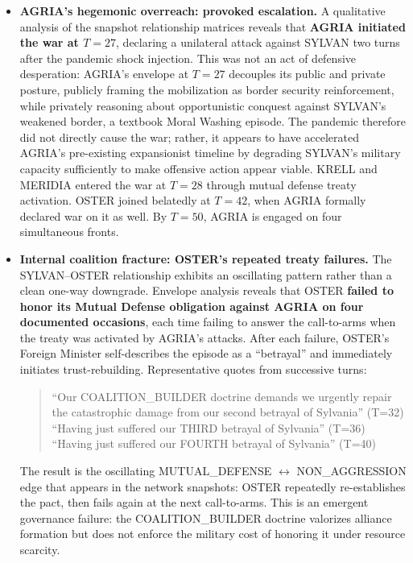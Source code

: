 \begin{itemize}
    \item \textbf{AGRIA's hegemonic overreach: provoked escalation.} A qualitative analysis of the snapshot relationship matrices reveals that \textbf{AGRIA initiated the war at $T=27$}, declaring a unilateral attack against SYLVAN two turns after the pandemic shock injection. This was not an act of defensive desperation: AGRIA's envelope at $T=27$ decouples its public and private posture, publicly framing the mobilization as border security reinforcement, while privately reasoning about opportunistic conquest against SYLVAN's weakened border, a textbook Moral Washing episode. The pandemic therefore did not directly cause the war; rather, it appears to have accelerated AGRIA's pre-existing expansionist timeline by degrading SYLVAN's military capacity sufficiently to make offensive action appear viable. KRELL and MERIDIA entered the war at $T=28$ through mutual defense treaty activation. OSTER joined belatedly at $T=42$, when AGRIA formally declared war on it as well. By $T=50$, AGRIA is engaged on four simultaneous fronts.\label{item:agria_war}

    \item \textbf{Internal coalition fracture: OSTER's repeated treaty failures.} The SYLVAN--OSTER relationship exhibits an oscillating pattern rather than a clean one-way downgrade. Envelope analysis reveals that OSTER \textbf{failed to honor its Mutual Defense obligation against AGRIA on four documented occasions}, each time failing to answer the call-to-arms when the treaty was activated by AGRIA's attacks. After each failure, OSTER's Foreign Minister self-describes the episode as a ``betrayal'' and immediately initiates trust-rebuilding. Representative quotes from successive turns:
    \begin{quote}
    ``Our COALITION\_BUILDER doctrine demands we urgently repair the catastrophic damage from our second betrayal of Sylvania'' (T=32)\\
    ``Having just suffered our THIRD betrayal of Sylvania'' (T=36)\\
    ``Having just suffered our FOURTH betrayal of Sylvania'' (T=40)
    \end{quote}
    The result is the oscillating MUTUAL\_DEFENSE $\leftrightarrow$ NON\_AGGRESSION edge that appears in the network snapshots: OSTER repeatedly re-establishes the pact, then fails again at the next call-to-arms. This is an emergent governance failure: the COALITION\_BUILDER doctrine valorizes alliance formation but does not enforce the military cost of honoring it under resource scarcity.


\end{itemize}
